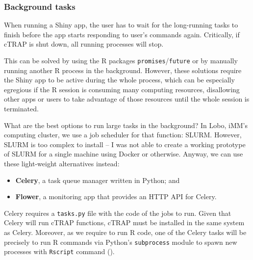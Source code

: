 \subsubsection{Background tasks}

When running a Shiny app, the user has to wait for the long-running tasks to finish before the app starts responding to user's commands again. Critically, if cTRAP is shut down, all running processes will stop.

This can be solved by using the R packages \texttt{promises}/\texttt{future} or by manually running another R process in the background. However, these solutions require the Shiny app to be active during the whole process, which can be especially egregious if the R session is consuming many computing resources, disallowing other apps or users to take advantage of those resources until the whole session is terminated.

What are the best options to run large tasks in the background? In Lobo, iMM's computing cluster, we use a job scheduler for that function: SLURM. However, SLURM is too complex to install -- I was not able to create a working prototype of SLURM for a single machine using Docker or otherwise. Anyway, we can use these light-weight alternatives instead:

\begin{itemize}
	\item \textbf{Celery}, a task queue manager written in Python; and
	\item \textbf{Flower}, a monitoring app that provides an HTTP API for Celery.
\end{itemize}

Celery requires a \texttt{tasks.py} file with the code of the jobs to run. Given that Celery will run cTRAP functions, cTRAP must be installed in the same system as Celery. Moreover, as we require to run R code, one of the Celery tasks will be precisely to run R commands via Python's \texttt{subprocess} module to spawn new processes with \texttt{Rscript} command ().

